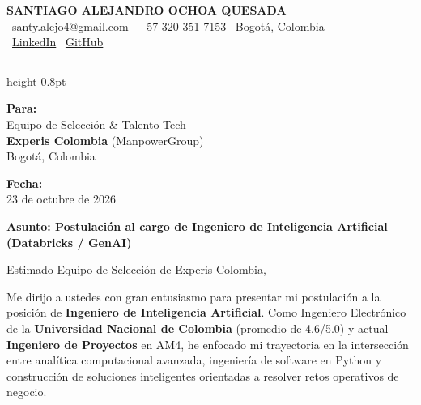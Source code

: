 \documentclass[11pt,a4paper]{article}
\begin{document}
\thispagestyle{empty}
\color{darktext}

\begin{center}
    {\Huge \bfseries\color{accent} SANTIAGO ALEJANDRO OCHOA QUESADA} \\[6pt]
    {\small\color{darktext}
    \faEnvelope\ \href{mailto:santy.alejo4@gmail.com}{santy.alejo4@gmail.com}
    \quad\textcolor{bulletline}{\textbar}\quad
    \faPhone\ +57 320 351 7153
    \quad\textcolor{bulletline}{\textbar}\quad
    \faMapMarker*\ Bogotá, Colombia \\[4pt]
    \faLinkedin\ \href{https://linkedin.com/in/santiago-alejandro-ochoa-quesada-a07a18288/}{LinkedIn}
    \quad\textcolor{bulletline}{\textbar}\quad
    \faGithub\ \href{https://github.com/Sochoaq}{GitHub}
    }
\end{center}
\vspace{2pt}
{\color{bulletline}\hrule height 0.8pt}
\vspace{10pt}

\noindent
\begin{minipage}[t]{0.62\textwidth}
    \textbf{\color{accent} Para:}\\
    Equipo de Selección \& Talento Tech\\
    \textbf{Experis Colombia} (ManpowerGroup)\\
    Bogotá, Colombia
\end{minipage}
\hfill
\begin{minipage}[t]{0.35\textwidth}\raggedleft
    \textbf{\color{accent} Fecha:}\\
    23 de octubre de 2026
\end{minipage}

\vspace{6pt}
\noindent
{\large\bfseries\color{accent} Asunto: Postulación al cargo de Ingeniero de Inteligencia Artificial (Databricks / GenAI)}
\vspace{2pt}

\noindent Estimado Equipo de Selección de Experis Colombia,

Me dirijo a ustedes con gran entusiasmo para presentar mi postulación a la posición de \textbf{Ingeniero de Inteligencia Artificial}. Como Ingeniero Electrónico de la \textbf{Universidad Nacional de Colombia} (promedio de 4.6/5.0) y actual \textbf{Ingeniero de Proyectos} en AM4, he enfocado mi trayectoria en la intersección entre analítica computacional avanzada, ingeniería de software en Python y construcción de soluciones inteligentes orientadas a resolver retos operativos de negocio.
\end{document}
